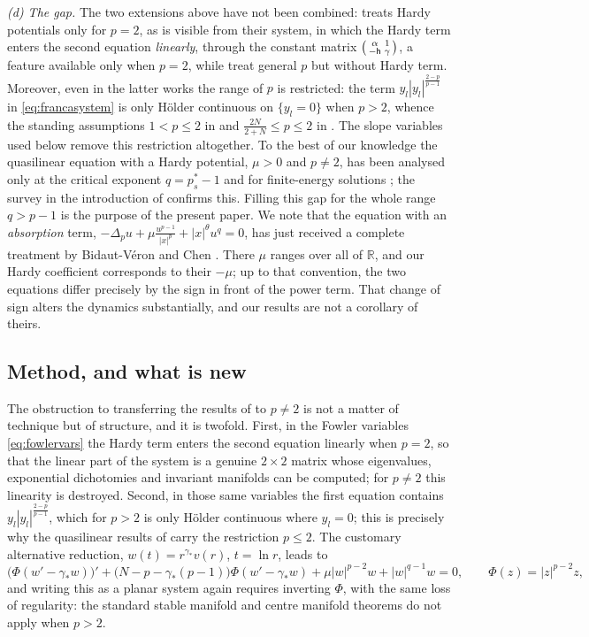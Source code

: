 \documentclass[11pt,reqno]{amsart}
\numberwithin{equation}{section}
\theoremstyle{plain}
\theoremstyle{definition}
\newcommand{\R}{\mathbb{R}}
\newcommand{\gs}{\gamma_{*}}
\begin{document}
\smallskip
\noindent\emph{(d) The gap.} The two extensions above have not been combined:
\cite{FrancaSfecci} treats Hardy potentials only for $p=2$, as is visible
from their system, in which the Hardy term enters the second equation
\emph{linearly}, through the constant matrix
$\begin{psmallmatrix}\alpha&1\\-\mathsf h&\gamma\end{psmallmatrix}$, a feature
available only when $p=2$, while
\cite{Franca2004,Franca2008,Franca2009,DFS2026} treat general $p$ but without
Hardy term. Moreover, even in the latter works the range of $p$ is restricted:
the term $y_{l}|y_{l}|^{\frac{2-p}{p-1}}$ in \eqref{eq:francasystem} is only
H\"older continuous on $\{y_{l}=0\}$ when $p>2$, whence the standing
assumptions $1<p\le2$ in \cite[\S2]{Franca2008} and
$\frac{2N}{2+N}\le p\le2$ in \cite[Rem.~7]{DFS2026}. The slope variables used
below remove this restriction altogether. To the best of our knowledge the
quasilinear equation with a Hardy potential, $\mu>0$ and $p\ne2$, has been
analysed only at the critical
exponent $q=p^{*}_{s}-1$ and for finite-energy solutions
\cite{AFP,Xiang2015,Xiang2017,OSV}; the survey in the introduction of
\cite{BidautVeronChen} confirms this. Filling this gap for the whole range
$q>p-1$ is the purpose of the present paper. We note that the equation with an
\emph{absorption} term,
$-\Delta_{p}u+\mu\frac{u^{p-1}}{|x|^{p}}+|x|^{\theta}u^{q}=0$, has just received
a complete treatment by Bidaut-V\'eron and Chen \cite{BidautVeronChen}. There
$\mu$ ranges over all of $\R$, and our Hardy coefficient corresponds to their
$-\mu$; up to that convention, the two equations differ precisely by the sign in
front of the power term. That change of sign alters the dynamics substantially,
and our results are not a corollary of theirs.

\subsection{Method, and what is new}

The obstruction to transferring the results of \cite{FrancaSfecci} to $p\ne2$ is
not a matter of technique but of structure, and it is twofold. First, in the
Fowler variables \eqref{eq:fowlervars} the Hardy term enters the second equation
linearly when $p=2$, so that the linear part of the system is a genuine
$2\times2$ matrix whose eigenvalues, exponential dichotomies and invariant
manifolds can be computed; for $p\ne2$ this linearity is destroyed. Second, in
those same variables the first equation contains
$y_{l}|y_{l}|^{\frac{2-p}{p-1}}$, which for $p>2$ is only H\"older continuous
where $y_{l}=0$; this is precisely why the quasilinear results of
\cite{Franca2008,DFS2026} carry the restriction $p\le2$. The customary
alternative
reduction, $w(t)=r^{\gs}v(r)$, $t=\ln r$, leads to
\[
\big(\Phi(w'-\gs w)\big)'+\big(N-p-\gs(p-1)\big)\Phi(w'-\gs w)
+\mu|w|^{p-2}w+|w|^{q-1}w=0,\qquad \Phi(z)=|z|^{p-2}z ,
\]
and writing this as a planar system again requires inverting $\Phi$, with the
same loss of regularity: the standard stable manifold and centre manifold
theorems do not apply when $p>2$.
\end{document}
